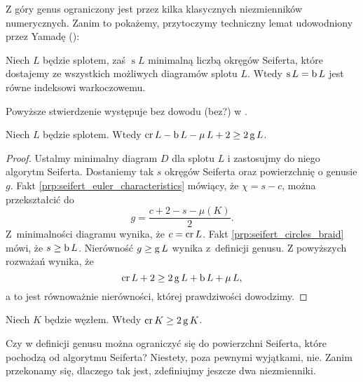 Z góry genus ograniczony jest przez kilka klasycznych niezmienników numerycznych.
Zanim to pokażemy, przytoczymy techniczny lemat udowodniony przez Yamadę (\cite{yamada87}):

\begin{proposition}
    \label{prp:seifert_circles_braid}
    Niech $L$ będzie splotem, zaś $\operatorname{s} L$ minimalną liczbą okręgów Seiferta, które dostajemy ze wszystkich możliwych diagramów splotu $L$.
    Wtedy $\operatorname{s} L = \operatorname{b} L$ jest równe indeksowi warkoczowemu.
%
\end{proposition}

Powyższe stwierdzenie występuje bez dowodu (bez?) w \cite[s. 17]{kawauchi96}.

\begin{proposition}
    Niech $L$ będzie splotem.
    Wtedy $\operatorname{cr} L - \operatorname{b} L - \operatorname{\mu} L + 2 \ge 2 \operatorname{g} L$.
\end{proposition}

\begin{proof}
    Ustalmy minimalny diagram $D$ dla splotu $L$ i zastosujmy do niego algorytm Seiferta.
    Dostaniemy tak $s$ okręgów Seiferta oraz powierzchnię o genusie $g$.
    Fakt \ref{prp:seifert_euler_characteristics} mówiący, że $\chi = s - c$, można przekształcić do
    \begin{equation}
        g = \frac{c + 2 - s - \mu(K)}{2}.
    \end{equation}
    Z~minimalności diagramu wynika, że $c = \operatorname{cr} L$.
    Fakt \ref{prp:seifert_circles_braid} mówi, że $s \ge \operatorname{b} L$.
    Nierówność $g \ge \operatorname{g} L$ wynika z~definicji genusu.
    Z powyższych rozważań wynika, że
    \begin{equation}
        \operatorname{cr} L + 2 \ge 2 \operatorname{g} L + \operatorname{b} L + \operatorname{\mu} L,
    \end{equation}
    a to jest równoważnie nierówności, której prawdziwości dowodzimy.
\end{proof}

\begin{corollary}
    \label{cor:crossing_genus}
    Niech $K$ będzie węzłem.
    Wtedy $\operatorname{cr} K \ge 2 \operatorname{g} K$.
\end{corollary}

Czy w definicji genusu można ograniczyć się do powierzchni Seiferta, które pochodzą od algorytmu Seiferta?
Niestety, poza pewnymi wyjątkami, nie.
Zanim przekonamy się, dlaczego tak jest, zdefiniujmy jeszcze dwa niezmienniki.

